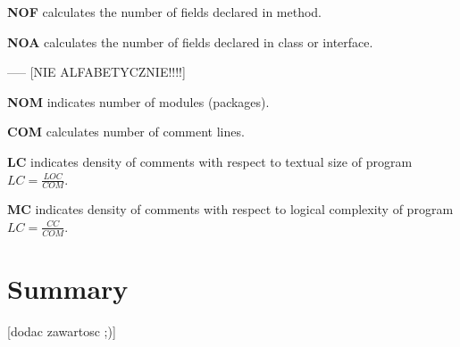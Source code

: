 \textbf{\ac{NOF}}  calculates the number of fields declared in method.

\textbf{\ac{NOA}}  calculates the number of fields declared in class or interface.

----- [NIE ALFABETYCZNIE!!!!]

\textbf{\ac{NOM}} indicates number of modules (packages).

\textbf{\ac{COM}} calculates number of comment lines.

\textbf{\ac{LC}} indicates density of comments with respect to textual size of program $LC=\frac {LOC}{COM}$.

\textbf{\ac{MC}} indicates density of comments with respect to logical complexity of program $LC=\frac { CC }{ COM } $.

\section{Summary}
[dodac zawartosc ;)]
